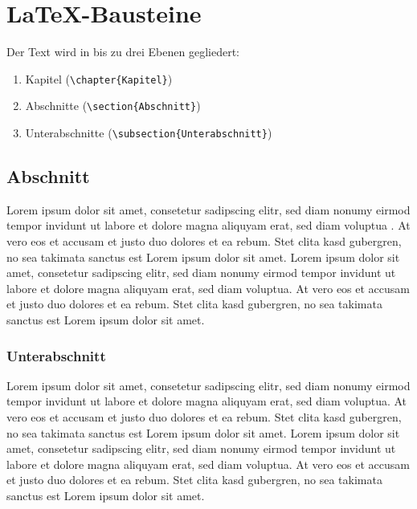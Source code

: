 \chapter{LaTeX-Bausteine}\label{Bausteine}

Der Text wird in bis zu drei Ebenen gegliedert:

\begin{enumerate}
	\item Kapitel (\verb|\chapter{Kapitel}|)
	\item Abschnitte (\verb|\section{Abschnitt}|)
	\item Unterabschnitte (\verb|\subsection{Unterabschnitt}|)
\end{enumerate}

\section{Abschnitt}

Lorem ipsum dolor sit amet, consetetur sadipscing elitr, sed diam nonumy eirmod tempor invidunt ut labore et dolore magna aliquyam erat, sed diam voluptua \cite{Nannen:03}. At vero eos et accusam et justo duo dolores et ea rebum. Stet clita kasd gubergren, no sea takimata sanctus est Lorem ipsum dolor sit amet. Lorem ipsum dolor sit amet, consetetur sadipscing elitr, sed diam nonumy eirmod tempor invidunt ut labore et dolore magna aliquyam erat, sed diam voluptua. At vero eos et accusam et justo duo dolores et ea rebum. Stet clita kasd gubergren, no sea takimata sanctus est Lorem ipsum dolor sit amet.

\subsection{Unterabschnitt} 

Lorem ipsum dolor sit amet, consetetur sadipscing elitr, sed diam nonumy eirmod tempor invidunt ut labore et dolore magna aliquyam erat, sed diam voluptua. At vero eos et accusam et justo duo dolores et ea rebum. Stet clita kasd gubergren, no sea takimata sanctus est Lorem ipsum dolor sit amet. Lorem ipsum dolor sit amet, consetetur sadipscing elitr, sed diam nonumy eirmod tempor invidunt ut labore et dolore magna aliquyam erat, sed diam voluptua. At vero eos et accusam et justo duo dolores et ea rebum. Stet clita kasd gubergren, no sea takimata sanctus est Lorem ipsum dolor sit amet.

